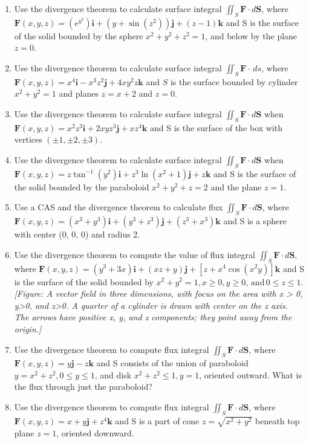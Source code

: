 \documentclass{exercises}
\begin{document}
\begin{enumerate}[start=1]
\item Use the divergence theorem to calculate surface integral $\iint_{S}\mathbf{F}\cdot d\mathbf{S}$, where $\mathbf{F}(x,y,z)=(e^{y^{2}})\mathbf{i}+(y+\sin(z^{2}))\mathbf{j}+(z-1)\mathbf{k}$ and S is the surface of the solid bounded by the sphere $x^{2}+y^{2}+z^{2}=1$, and below by the plane $z=0$.
\item Use the divergence theorem to calculate surface integral $\iint_{S}\mathbf{F}\cdot \,ds$, where $\mathbf{F}(x,y,z)=x^{4}\mathbf{i}-x^{3}z^{2}\mathbf{j}+4xy^{2}z\mathbf{k}$ and $S$ is the surface bounded by cylinder $x^{2}+y^{2}=1$ and planes $z=x+2$ and $z=0$.
\item Use the divergence theorem to calculate surface integral $\iint_{S}\mathbf{F}\cdot d\mathbf{S}$ when $\mathbf{F}(x,y,z)=x^{2}z^{3}\mathbf{i}+2xyz^{3}\mathbf{j}+xz^{4}\mathbf{k}$ and S is the surface of the box with vertices $(\pm1,\pm2,\pm3)$.
\item Use the divergence theorem to calculate surface integral $\iint_{S}\mathbf{F}\cdot d\mathbf{S}$ when $\mathbf{F}(x,y,z)=z\tan^{-1}(y^{2})\mathbf{i}+z^{3}\ln(x^{2}+1)\mathbf{j}+z\mathbf{k}$ and S is the surface of the solid bounded by the paraboloid $x^{2}+y^{2}+z=2$ and the plane $z=1$.
\item \techrequired Use a CAS and the divergence theorem to calculate flux $\iint_{S}\mathbf{F}\cdot d\mathbf{S}$, where $\mathbf{F}(x,y,z)=(x^{3}+y^{3})\mathbf{i}+(y^{3}+z^{3})\mathbf{j}+(z^{3}+x^{3})\mathbf{k}$ and S is a sphere with center (0, 0, 0) and radius 2.
\item Use the divergence theorem to compute the value of flux integral $\iint_{S}\mathbf{F}\cdot d\mathbf{S}$, where $\mathbf{F}(x,y,z)=(y^{3}+3x)\mathbf{i}+(xz+y)\mathbf{j}+[z+x^{4}\cos(x^{2}y)]\mathbf{k}$ and S is the surface of the solid bounded by $x^{2}+y^{2}=1,x\ge0,y\ge0,\,\text{and}\,0\le z\le1$. \\ \textit{[Figure: A vector field in three dimensions, with focus on the area with x > 0, y>0, and z>0. A quarter of a cylinder is drawn with center on the z axis. The arrows have positive x, y, and z components; they point away from the origin.]}
\item Use the divergence theorem to compute flux integral $\iint_{S}\mathbf{F}\cdot d\mathbf{S}$, where $\mathbf{F}(x,y,z)=y\mathbf{j}-z\mathbf{k}$ and S consists of the union of paraboloid $y=x^{2}+z^{2},0\le y\le1$, and disk $x^{2}+z^{2}\le1,y=1$, oriented outward. What is the flux through just the paraboloid?
\item Use the divergence theorem to compute flux integral $\iint_{S}\mathbf{F}\cdot d\mathbf{S}$, where $\mathbf{F}(x,y,z)=x+y\mathbf{j}+z^{4}\mathbf{k}$ and S is a part of cone $z=\sqrt{x^{2}+y^{2}}$ beneath top plane $z=1$, oriented downward.

\end{enumerate}
\end{document}
